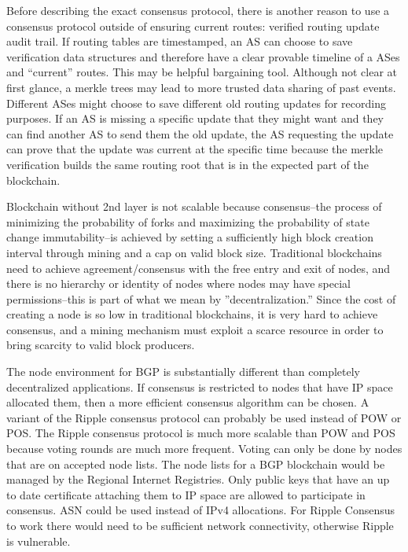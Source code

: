 \documentclass[letterpaper, 10 pt, conference]{ieeeconf}  %
\begin{document}
Before describing the exact consensus protocol, there is another reason to use a consensus protocol outside of ensuring current routes: verified routing update audit trail. If routing tables are timestamped, an AS can choose to save verification data structures and therefore have a clear provable timeline of a ASes and “current” routes. This may be helpful bargaining tool. Although not clear at first glance, a merkle trees may lead to more trusted data sharing of past events. Different ASes might choose to save different old routing updates for recording purposes. If an AS is missing a specific update that they might want and they can find another AS to send them the old update, the AS requesting the update can prove that the update was current at the specific time because the merkle verification builds the same routing root that is in the expected part of the blockchain. 

Blockchain without 2nd layer is not scalable because consensus--the process of minimizing the probability of forks and maximizing the probability of state change immutability--is achieved by setting a sufficiently high block creation interval through mining and a cap on valid block size. Traditional blockchains need to achieve agreement/consensus with the free entry and exit of nodes, and there is no hierarchy or identity of nodes where nodes may have special permissions--this is part of what we mean by ”decentralization.” Since the cost of creating a node is so low in traditional blockchains, it is very hard to achieve consensus, and a mining mechanism must exploit a scarce resource in order to bring scarcity to valid block producers. 

The node environment for BGP is substantially different than completely decentralized applications. If consensus is restricted to nodes that have IP space allocated them, then a more efficient consensus algorithm can be chosen. A variant of the Ripple consensus protocol can probably be used instead of POW or POS. The Ripple consensus protocol is much more scalable than POW and POS because voting rounds are much more frequent. Voting can only be done by nodes that are on accepted node lists. The node lists for a BGP blockchain would be managed by the Regional Internet Registries. Only public keys that have an up to date certificate attaching them to IP space are allowed to participate in consensus. ASN could be used instead of IPv4 allocations. For Ripple Consensus to work there would need to be sufficient network connectivity, otherwise Ripple is vulnerable.
\end{document}
